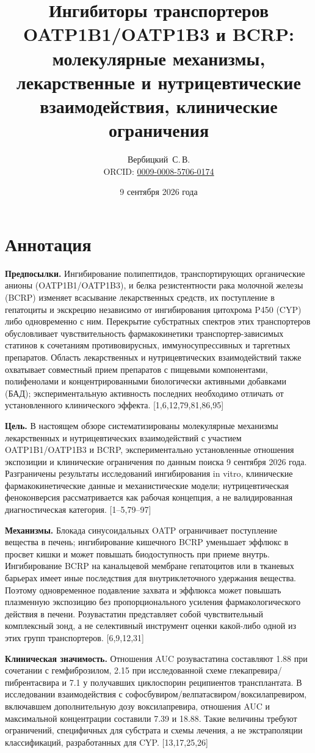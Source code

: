 \documentclass[11pt]{article}
\title{Ингибиторы транспортеров OATP1B1/OATP1B3 и BCRP:  молекулярные механизмы, лекарственные и нутрицевтические взаимодействия, клинические ограничения}
\author{Вербицкий~С.\,В.\\[0.3em]
  {\small ORCID: \href{https://orcid.org/0009-0008-5706-0174}{0009-0008-5706-0174}}}
\date{9 сентября 2026 года}
\begin{document}
\maketitle

\section*{Аннотация}

\textbf{Предпосылки.} Ингибирование полипептидов, транспортирующих органические анионы (OATP1B1/OATP1B3), и белка резистентности рака молочной железы (BCRP) изменяет всасывание лекарственных средств, их поступление в гепатоциты и экскрецию независимо от ингибирования цитохрома P450 (CYP) либо одновременно с ним. Перекрытие субстратных спектров этих транспортеров обусловливает чувствительность фармакокинетики транспортер-зависимых статинов к сочетаниям противовирусных, иммуносупрессивных и таргетных препаратов. Область лекарственных и нутрицевтических взаимодействий также охватывает совместный прием препаратов с пищевыми компонентами, полифенолами и концентрированными биологически активными добавками (БАД); экспериментальную активность последних необходимо отличать от установленного клинического эффекта. [1,6,12,79,81,86,95]

\textbf{Цель.} В настоящем обзоре систематизированы молекулярные механизмы лекарственных и нутрицевтических взаимодействий с участием OATP1B1/OATP1B3 и BCRP, экспериментально установленные отношения экспозиции и клинические ограничения по данным поиска 9 сентября 2026 года. Разграничены результаты исследований ингибирования in vitro, клинические фармакокинетические данные и механистические модели; нутрицевтическая феноконверсия рассматривается как рабочая концепция, а не валидированная диагностическая категория. [1--5,79--97]

\textbf{Механизмы.} Блокада синусоидальных OATP ограничивает поступление вещества в печень; ингибирование кишечного BCRP уменьшает эффлюкс в просвет кишки и может повышать биодоступность при приеме внутрь. Ингибирование BCRP на канальцевой мембране гепатоцитов или в тканевых барьерах имеет иные последствия для внутриклеточного удержания вещества. Поэтому одновременное подавление захвата и эффлюкса может повышать плазменную экспозицию без пропорционального усиления фармакологического действия в печени. Розувастатин представляет собой чувствительный комплексный зонд, а не селективный инструмент оценки какой-либо одной из этих групп транспортеров. [6,9,12,31]

\textbf{Клиническая значимость.} Отношения AUC розувастатина составляют 1.88 при сочетании с гемфиброзилом, 2.15 при исследованной схеме глекапревира/пибрентасвира и 7.1 у получавших циклоспорин реципиентов трансплантата. В исследовании взаимодействия с софосбувиром/\allowbreak велпатасвиром/\allowbreak воксилапревиром, включавшем дополнительную дозу воксилапревира, отношения AUC и максимальной концентрации составили 7.39 и 18.88. Такие величины требуют ограничений, специфичных для субстрата и схемы лечения, а не экстраполяции классификаций, разработанных для CYP. [13,17,25,26]
\end{document}
